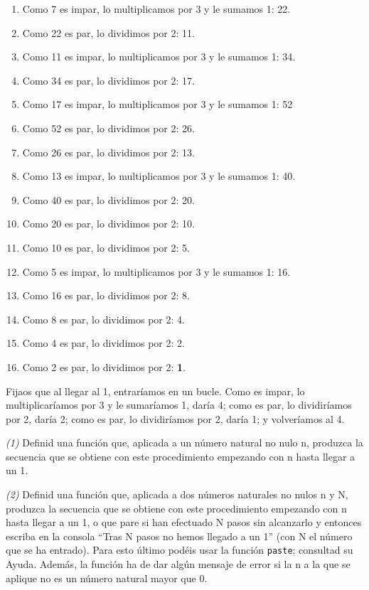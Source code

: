 \documentclass[
]{book}
\theoremstyle{definition}
\theoremstyle{definition}
\theoremstyle{definition}
\theoremstyle{remark}
\begin{document}
\begin{enumerate}
\def\labelenumi{\arabic{enumi}.}
\item
  Como 7 es impar, lo multiplicamos por 3 y le sumamos 1: 22.
\item
  Como 22 es par, lo dividimos por 2: 11.
\item
  Como 11 es impar, lo multiplicamos por 3 y le sumamos 1: 34.
\item
  Como 34 es par, lo dividimos por 2: 17.
\item
  Como 17 es impar, lo multiplicamos por 3 y le sumamos 1: 52
\item
  Como 52 es par, lo dividimos por 2: 26.
\item
  Como 26 es par, lo dividimos por 2: 13.
\item
  Como 13 es impar, lo multiplicamos por 3 y le sumamos 1: 40.
\item
  Como 40 es par, lo dividimos por 2: 20.
\item
  Como 20 es par, lo dividimos por 2: 10.
\item
  Como 10 es par, lo dividimos por 2: 5.
\item
  Como 5 es impar, lo multiplicamos por 3 y le sumamos 1: 16.
\item
  Como 16 es par, lo dividimos por 2: 8.
\item
  Como 8 es par, lo dividimos por 2: 4.
\item
  Como 4 es par, lo dividimos por 2: 2.
\item
  Como 2 es par, lo dividimos por 2: \textbf{1}.
\end{enumerate}

Fijaos que al llegar al 1, entraríamos en un bucle. Como es impar, lo multiplicaríamos por 3 y le sumaríamos 1, daría 4; como es par, lo dividiríamos por 2, daría 2; como es par, lo dividiríamos por 2, daría 1; y volveríamos al 4.

\emph{(1)} Definid una función que, aplicada a un número natural no nulo n, produzca la secuencia que se obtiene con este procedimiento empezando con n hasta llegar a un 1.

\emph{(2)} Definid una función que, aplicada a dos números naturales no nulos n y N, produzca la secuencia que se obtiene con este procedimiento empezando con n hasta llegar a un 1, o que pare si han efectuado N pasos sin alcanzarlo y entonces escriba en la consola ``Tras N pasos no hemos llegado a un 1'' (con N el número que se ha entrado). Para esto último podéis usar la función \texttt{paste}; consultad su Ayuda. Además, la función ha de dar algún mensaje de error si la n a la que se aplique no es un número natural mayor que 0.
\end{document}
